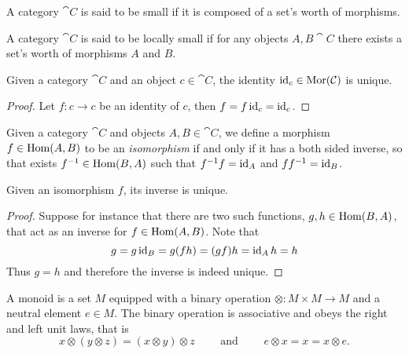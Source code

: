 \begin{definition}[Small]\label{def: small cat}
  A category \(\cat C\) is said to be small if it is composed of a
  set's worth of morphisms.
\end{definition}

\begin{definition}
  A category \(\cat C\) is said to be locally small if for any objects \(A,B
  \cat C\) there exists a set's worth of morphisms \(A\) and \(B\).
\end{definition}

\begin{corollary}\label{cor: unique identity}
  Given a category \(\cat C\) and an object \(c \in \cat C\), the identity
  \(\operatorname{id}_c \in \operatorname{Mor}(\mathcal C)\) is unique.
\end{corollary}

\begin{proof}
  Let \(f: c \to c\) be an identity of \(c\), then \(f = f \operatorname{id}_c = \operatorname{id}_c\).
\end{proof}

\begin{definition}
  Given a category \(\cat{C}\) and objects  \(A, B \in \cat{C}\), we
  define a morphism \(f \in \operatorname{Hom}(A, B)\) to be an \emph{isomorphism} if
  and only if it has a both sided inverse, so that exists \(f^{-1} \in
  \operatorname{Hom}(B, A)\) such that \(f^{-1}f = \operatorname{id}_A\) and  \(ff^{-1} =
  \operatorname{id}_B\).
\end{definition}

\begin{proposition}\label{prop: iso unique inverse}
   Given an isomorphism \(f\), its inverse is unique.
\end{proposition}

\begin{proof}
   Suppose for instance that there are two such functions, \(g, h \in
   \operatorname{Hom}(B, A)\), that act as an inverse for \(f \in \operatorname{Hom}(A,
   B)\). Note that
   \[
      g = g \operatorname{id}_B = g(f h) = (g f) h = \operatorname{id}_A h = h
   \]
   Thus \(g = h\) and therefore the inverse is indeed unique.
\end{proof}

\begin{definition}[Monoid]\label{def: monoid}
  A monoid is a set \(M\) equipped with a binary operation \(\otimes: M \times M
  \to M\) and a neutral element \(e \in M\). The binary operation is associative
  and obeys the right and left unit laws, that is
  \[
    x \otimes (y \otimes z) = (x \otimes y) \otimes z \qquad \text{ and } \qquad
    e \otimes x = x = x \otimes e.
  \]
\end{definition}

